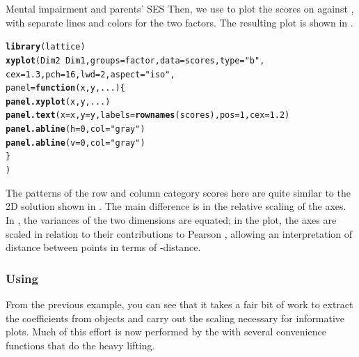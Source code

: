\documentclass[11pt]{book}\usepackage[]{graphicx}\usepackage[]{color}
\makeatletter
\newcommand{\hlnum}[1]{\textcolor[rgb]{0.686,0.059,0.569}{#1}}%
\newcommand{\hlstr}[1]{\textcolor[rgb]{0.192,0.494,0.8}{#1}}%
\newcommand{\hlopt}[1]{\textcolor[rgb]{0,0,0}{#1}}%
\newcommand{\hlstd}[1]{\textcolor[rgb]{0.345,0.345,0.345}{#1}}%
\newcommand{\hlkwa}[1]{\textcolor[rgb]{0.161,0.373,0.58}{\textbf{#1}}}%
\newcommand{\hlkwc}[1]{\textcolor[rgb]{0.333,0.667,0.333}{#1}}%
\newcommand{\hlkwd}[1]{\textcolor[rgb]{0.737,0.353,0.396}{\textbf{#1}}}%
\newenvironment{kframe}{%
 \def\at@end@of@kframe{}%
 \ifinner\ifhmode%
  \def\at@end@of@kframe{\end{minipage}}%
  \begin{minipage}{\columnwidth}%
 \fi\fi%
 \def\FrameCommand##1{\hskip\@totalleftmargin \hskip-\fboxsep
 \colorbox{shadecolor}{##1}\hskip-\fboxsep
     \hskip-\linewidth \hskip-\@totalleftmargin \hskip\columnwidth}%
 \MakeFramed {\advance\hsize-\width
   \@totalleftmargin\z@ \linewidth\hsize
   \@setminipage}}%
 {\par\unskip\endMakeFramed%
 \at@end@of@kframe}
\newenvironment{knitrout}{}{} %
\renewenvironment{knitrout}{\small\renewcommand{\baselinestretch}{.85}}{} %
\makeatother
\begin{document}
\begin{Example}[mental5]{Mental impairment and parents' SES}
Then, we use  to plot the scores on  against ,
with separate lines and colors for the two factors.  The resulting plot is
shown in .
\begin{knitrout}
\color{fgcolor}\begin{kframe}
\begin{alltt}
\hlkwd{library}\hlstd{(lattice)}
\hlkwd{xyplot}\hlstd{(Dim2} \hlopt{~} \hlstd{Dim1,} \hlkwc{groups}\hlstd{=factor,} \hlkwc{data}\hlstd{=scores,} \hlkwc{type}\hlstd{=}\hlstr{"b"}\hlstd{,}
       \hlkwc{cex}\hlstd{=}\hlnum{1.3}\hlstd{,} \hlkwc{pch}\hlstd{=}\hlnum{16}\hlstd{,} \hlkwc{lwd}\hlstd{=}\hlnum{2}\hlstd{,} \hlkwc{aspect}\hlstd{=}\hlstr{"iso"}\hlstd{,}
       \hlkwc{panel}\hlstd{=}\hlkwa{function}\hlstd{(}\hlkwc{x}\hlstd{,} \hlkwc{y}\hlstd{,} \hlkwc{...}\hlstd{) \{}
          \hlkwd{panel.xyplot}\hlstd{(x, y, ...)}
          \hlkwd{panel.text}\hlstd{(}\hlkwc{x}\hlstd{=x,} \hlkwc{y}\hlstd{=y,} \hlkwc{labels}\hlstd{=}\hlkwd{rownames}\hlstd{(scores),} \hlkwc{pos}\hlstd{=}\hlnum{1}\hlstd{,} \hlkwc{cex}\hlstd{=}\hlnum{1.2}\hlstd{)}
          \hlkwd{panel.abline}\hlstd{(}\hlkwc{h}\hlstd{=}\hlnum{0}\hlstd{,} \hlkwc{col}\hlstd{=}\hlstr{"gray"}\hlstd{)}
          \hlkwd{panel.abline}\hlstd{(}\hlkwc{v}\hlstd{=}\hlnum{0}\hlstd{,} \hlkwc{col}\hlstd{=}\hlstr{"gray"}\hlstd{)}
          \hlstd{\}}
  \hlstd{)}
\end{alltt}
\end{kframe}
\end{knitrout}
The patterns of the row and column category scores here are quite similar to the
2D \ca solution shown in .  The main difference is in the
relative scaling of the axes.  In , the variances of the
two dimensions are equated; in the \ca plot, the axes are scaled in relation to
their contributions to Pearson \chisq, allowing an interpretation of distance between
points in terms of \chisq-distance.

\end{Example}

\subsubsection[Using logmult]{Using }

From the previous example, you can see that it takes a fair bit of work to extract the
coefficients from  objects and carry out the scaling necessary for informative
plots.  Much of this effort is now performed by the  with several
convenience functions that do the heavy lifting.
\end{document}
